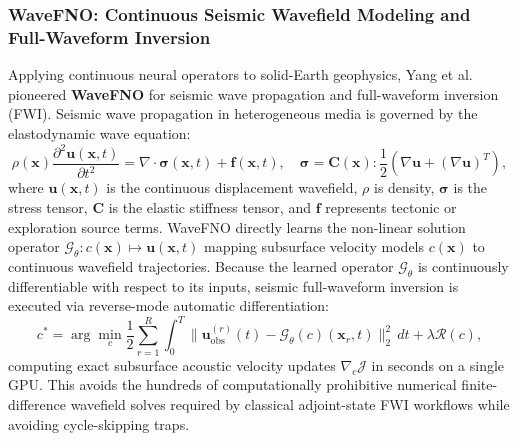 \subsubsection{WaveFNO: Continuous Seismic Wavefield Modeling and Full-Waveform Inversion}
Applying continuous neural operators to solid-Earth geophysics, Yang et al.~\cite{yang2021seismic} pioneered \textbf{WaveFNO} for seismic wave propagation and full-waveform inversion (FWI). Seismic wave propagation in heterogeneous media is governed by the elastodynamic wave equation:
\begin{equation}
    \rho(\mathbf{x}) \frac{\partial^2 \mathbf{u}(\mathbf{x}, t)}{\partial t^2} = \nabla \cdot \boldsymbol{\sigma}(\mathbf{x}, t) + \mathbf{f}(\mathbf{x}, t), \quad \boldsymbol{\sigma} = \mathbf{C}(\mathbf{x}) : \frac{1}{2}\left( \nabla \mathbf{u} + (\nabla \mathbf{u})^T \right),
    \label{eq:elastodynamic_wave}
\end{equation}
where $\mathbf{u}(\mathbf{x}, t)$ is the continuous displacement wavefield, $\rho$ is density, $\boldsymbol{\sigma}$ is the stress tensor, $\mathbf{C}$ is the elastic stiffness tensor, and $\mathbf{f}$ represents tectonic or exploration source terms. WaveFNO directly learns the non-linear solution operator $\mathcal{G}_\theta: c(\mathbf{x}) \mapsto \mathbf{u}(\mathbf{x}, t)$ mapping subsurface velocity models $c(\mathbf{x})$ to continuous wavefield trajectories. Because the learned operator $\mathcal{G}_\theta$ is continuously differentiable with respect to its inputs, seismic full-waveform inversion is executed via reverse-mode automatic differentiation:
\begin{equation}
    c^* = \arg\min_{c} \frac{1}{2} \sum_{r=1}^R \int_0^T \|\mathbf{u}_{\text{obs}}^{(r)}(t) - \mathcal{G}_\theta(c)(\mathbf{x}_r, t)\|_2^2 \, dt + \lambda \mathcal{R}(c),
    \label{eq:fwi_objective}
\end{equation}
computing exact subsurface acoustic velocity updates $\nabla_c \mathcal{J}$ in seconds on a single GPU. This avoids the hundreds of computationally prohibitive numerical finite-difference wavefield solves required by classical adjoint-state FWI workflows while avoiding cycle-skipping traps.

